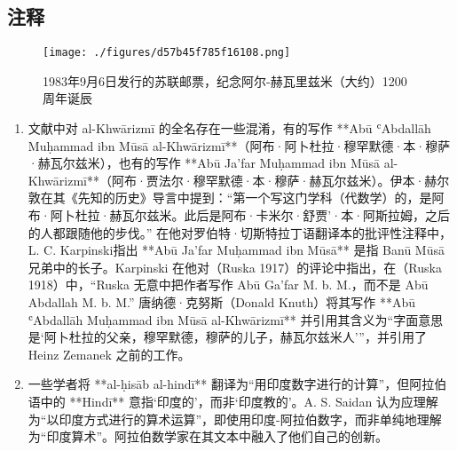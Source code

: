\subsection{注释}  
\begin{figure}[ht]
\centering
\texttt{[image: ./figures/d57b45f785f16108.png]}
\caption{1983年9月6日发行的苏联邮票，纪念阿尔-赫瓦里兹米（大约）1200周年诞辰} \label{fig_HLZM_12}
\end{figure}
\begin{enumerate}
\item 文献中对 al-Khwārizmī 的全名存在一些混淆，有的写作 **Abū ʿAbdallāh Muḥammad ibn Mūsā al-Khwārizmī**（阿布·阿卜杜拉·穆罕默德·本·穆萨·赫瓦尔兹米），也有的写作 **Abū Ja'far Muḥammad ibn Mūsā al-Khwārizmī**（阿布·贾法尔·穆罕默德·本·穆萨·赫瓦尔兹米）。伊本·赫尔敦在其《先知的历史》导言中提到：“第一个写这门学科（代数学）的，是阿布·阿卜杜拉·赫瓦尔兹米。此后是阿布·卡米尔·舒贾'·本·阿斯拉姆，之后的人都跟随他的步伐。”  
在他对罗伯特·切斯特拉丁语翻译本的批评性注释中，L. C. Karpinski指出 **Abū Ja'far Muḥammad ibn Mūsā** 是指 Banū Mūsā 兄弟中的长子。Karpinski 在他对（Ruska 1917）的评论中指出，在（Ruska 1918）中，“Ruska 无意中把作者写作 Abū Ga'far M. b. M.，而不是 Abū Abdallah M. b. M.”  
唐纳德·克努斯（Donald Knuth）将其写作 **Abū ʿAbdallāh Muḥammad ibn Mūsā al-Khwārizmī** 并引用其含义为“字面意思是‘阿卜杜拉的父亲，穆罕默德，穆萨的儿子，赫瓦尔兹米人’”，并引用了 Heinz Zemanek 之前的工作。  
\item 一些学者将 **al-ḥisāb al-hindī** 翻译为“用印度数字进行的计算”，但阿拉伯语中的 **Hindī** 意指‘印度的’，而非‘印度教的’。A. S. Saidan 认为应理解为“以印度方式进行的算术运算”，即使用印度-阿拉伯数字，而非单纯地理解为“印度算术”。阿拉伯数学家在其文本中融入了他们自己的创新。
\end{enumerate}
